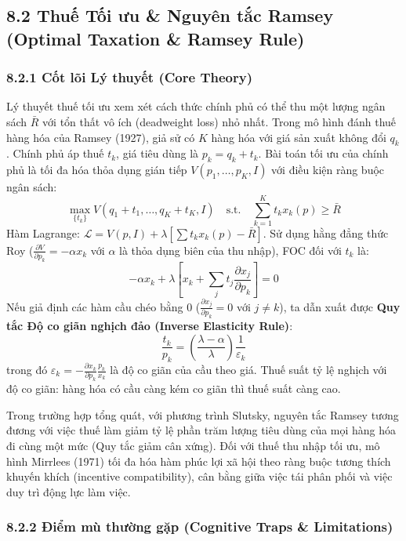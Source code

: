 \documentclass[
]{article}
\begin{document}
\subsection{8.2 Thuế Tối ưu \& Nguyên tắc Ramsey (Optimal Taxation \&
Ramsey
Rule)}\label{thuux1ebf-tux1ed1i-ux1b0u-nguyuxean-tux1eafc-ramsey-optimal-taxation-ramsey-rule}

\subsubsection{8.2.1 Cốt lõi Lý thuyết (Core
Theory)}\label{cux1ed1t-luxf5i-luxfd-thuyux1ebft-core-theory-25}

Lý thuyết thuế tối ưu xem xét cách thức chính phủ có thể thu một lượng
ngân sách \(\bar{R}\) với tổn thất vô ích (deadweight loss) nhỏ nhất.
Trong mô hình đánh thuế hàng hóa của Ramsey (1927), giả sử có \(K\) hàng
hóa với giá sản xuất không đổi \(q_k\). Chính phủ áp thuế \(t_k\), giá
tiêu dùng là \(p_k = q_k + t_k\). Bài toán tối ưu của chính phủ là tối
đa hóa thỏa dụng gián tiếp \(V(p_1, \dots, p_K, I)\) với điều kiện ràng
buộc ngân sách:
\[ \max_{\{t_k\}} V(q_1+t_1, \dots, q_K+t_K, I) \quad \text{s.t.} \quad \sum_{k=1}^K t_k x_k(p) \geq \bar{R} \]
Hàm Lagrange:
\(\mathcal{L} = V(p, I) + \lambda \left[ \sum t_k x_k(p) - \bar{R} \right]\).
Sử dụng hằng đẳng thức Roy
(\(\frac{\partial V}{\partial p_k} = -\alpha x_k\) với \(\alpha\) là
thỏa dụng biên của thu nhập), FOC đối với \(t_k\) là:
\[ -\alpha x_k + \lambda \left[ x_k + \sum_{j} t_j \frac{\partial x_j}{\partial p_k} \right] = 0 \]
Nếu giả định các hàm cầu chéo bằng 0
(\(\frac{\partial x_j}{\partial p_k} = 0\) với \(j \neq k\)), ta dẫn
xuất được \textbf{Quy tắc Độ co giãn nghịch đảo (Inverse Elasticity
Rule)}:
\[ \frac{t_k}{p_k} = \left( \frac{\lambda - \alpha}{\lambda} \right) \frac{1}{\varepsilon_k} \]
trong đó
\(\varepsilon_k = - \frac{\partial x_k}{\partial p_k} \frac{p_k}{x_k}\)
là độ co giãn của cầu theo giá. Thuế suất tỷ lệ nghịch với độ co giãn:
hàng hóa có cầu càng kém co giãn thì thuế suất càng cao.

Trong trường hợp tổng quát, với phương trình Slutsky, nguyên tắc Ramsey
tương đương với việc thuế làm giảm tỷ lệ phần trăm lượng tiêu dùng của
mọi hàng hóa đi cùng một mức (Quy tắc giảm cân xứng). Đối với thuế thu
nhập tối ưu, mô hình Mirrlees (1971) tối đa hóa hàm phúc lợi xã hội theo
ràng buộc tương thích khuyến khích (incentive compatibility), cân bằng
giữa việc tái phân phối và việc duy trì động lực làm việc.

\subsubsection{8.2.2 Điểm mù thường gặp (Cognitive Traps \&
Limitations)}\label{ux111iux1ec3m-muxf9-thux1b0ux1eddng-gux1eb7p-cognitive-traps-limitations-50}
\end{document}
